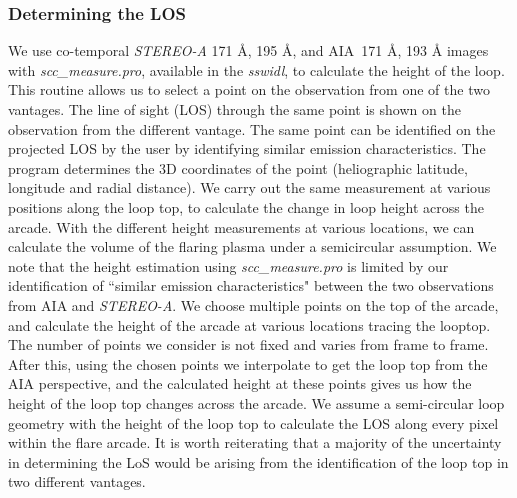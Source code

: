 \subsubsection{Determining the LOS}\label{sec:los}

We use co-temporal {\it STEREO-A} 171 {\AA}, 195 {\AA}, and AIA~171 {\AA}, 193 {\AA} images with \textit{scc\_measure.pro}, available in the \textit{sswidl}, to calculate the height of the loop. This routine allows us to select a point on the observation from one of the two vantages. The line of sight (LOS) through the same point is shown on the observation from the different vantage. The same point can be identified on the projected LOS by the user by identifying similar emission characteristics. The program determines the 3D coordinates of the point (heliographic latitude, longitude and radial distance). We carry out the same measurement at various positions along the loop top, to calculate the change in loop height across the arcade. With the different height measurements at various locations, we can calculate the volume of the flaring plasma under a semicircular assumption. We note that the height estimation using \textit{scc\_measure.pro} is limited by our identification of ``similar emission characteristics" between the two observations from AIA and {\it STEREO-A}. We choose multiple points on the top of the arcade, and calculate the height of the arcade at various locations tracing the looptop. The number of points we consider is not fixed and varies from frame to frame. After this, using the chosen points we interpolate to get the loop top from the AIA perspective, and the calculated height at these points gives us how the height of the loop top changes across the arcade. We assume a semi-circular loop geometry with the height of the loop top to calculate the LOS along every pixel within the flare arcade. It is worth reiterating that a majority of the uncertainty in determining the LoS would be arising from the identification of the loop top in two different vantages.

